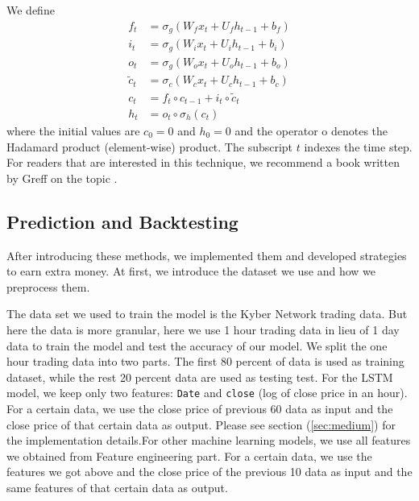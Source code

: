 \documentclass[twoside]{report}
\newcommand{\code}{\texttt}
\begin{document}
\begin{spacing}{1}
We define 
\[
\begin{aligned}
f_{t} &=\sigma_{g}\left(W_{f} x_{t}+U_{f} h_{t-1}+b_{f}\right) \\
i_{t} &=\sigma_{g}\left(W_{i} x_{t}+U_{i} h_{t-1}+b_{i}\right) \\
o_{t} &=\sigma_{g}\left(W_{o} x_{t}+U_{o} h_{t-1}+b_{o}\right) \\
\tilde{c}_{t} &=\sigma_{c}\left(W_{c} x_{t}+U_{c} h_{t-1}+b_{c}\right) \\
c_{t} &=f_{t} \circ c_{t-1}+i_{t} \circ \tilde{c}_{t} \\
h_{t} &=o_{t} \circ \sigma_{h}\left(c_{t}\right)
\end{aligned}
\]
where the initial values are $c_{0}=0$ and $h_{0}=0$ and the operator o denotes the Hadamard product (element-wise) product. The subscript $t$ indexes the time step. For readers that are interested in this technique, we recommend a book written by Greff on the topic \cite{greff2016lstm}.




\subsection{Prediction and Backtesting}
After introducing these methods, we implemented them and developed strategies to earn extra money. At first, we introduce the dataset we use and how we preprocess them. 

The data set we used to train the model is the Kyber Network trading data. But here the data is more granular, here we use 1 hour trading data in lieu of 1 day data to train the model and test the accuracy of our model.  We split the one hour trading data into two parts. The first 80 percent of data is used as training dataset, while the rest 20 percent data are used as testing test. For the LSTM model, we keep only two features: \code{Date} and \code{close} (log of close price in an hour). For a certain data, we use the close price of previous 60 data as input and the close price of that certain data as output.   Please see section (\ref{sec:medium}) for the implementation details.For other machine learning models, we use all features we obtained from Feature engineering part. For a certain data, we use the features we got above and the close price of the previous 10 data as input and the same features of that certain data as output.



\end{spacing}
\end{document}
